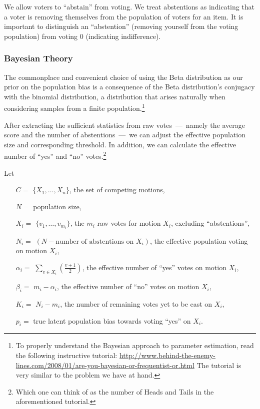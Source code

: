 \documentclass[chi_draft]{sigchi}
\begin{document}
We allow voters to ``abstain'' from voting.
We treat abstentions as indicating that a voter is removing themselves from the population of voters for an item.
It is important to distinguish an ``abstention'' (removing yourself from the voting population) from voting $0$
(indicating indifference).

\subsubsection{Bayesian Theory}

The commonplace and convenient choice of using the Beta distribution as our prior on the population bias is a
consequence of the Beta distribution's conjugacy with the binomial distribution, a distribution that arises
naturally when considering samples from a finite population.\footnote{To
properly understand the Bayesian approach to parameter estimation, read the following instructive tutorial:
\url{http://www.behind-the-enemy-lines.com/2008/01/are-you-bayesian-or-frequentist-or.html}
The tutorial is very similar to the problem we have at hand.}

After extracting the sufficient statistics from raw votes~---~namely the average score and the number of
abstentions~---~we can adjust the effective population size and corresponding threshold.
In addition, we can calculate the effective number of ``yes'' and ``no'' votes.\footnote{Which one can think
of as the number of Heads and Tails in the aforementioned tutorial.}

Let
\begin{description}
\begin{itemize}
\item[$C = $] $\{X_1,\ldots, X_n\}$, the set of competing motions,
\item[$N = $] population size,
\item[$X_i = $] $\{v_1, \ldots, v_{m_i}\}$, the $m_i$ raw votes for motion $X_i$, excluding ``abstentions'',
\item[$N_i = $] $(N - \textrm{number of abstentions on } X_i)$, the effective population voting on motion $X_i$,
\item[$\alpha_i = $] $\sum\limits_{v \in X_i} \left(\frac{v+1}{2}\right)$, the effective number of ``yes'' votes on motion $X_i$,
\item[$\beta_i = $] $m_i - \alpha_i$, the effective number of ``no'' votes on motion $X_i$,
\item[$K_i = $] $N_i - m_i$, the number of remaining votes yet to be cast on $X_i$,
\item[$p_i = $] true latent population bias towards voting ``yes'' on $X_i$.
\end{itemize}
\end{description}
\end{document}
